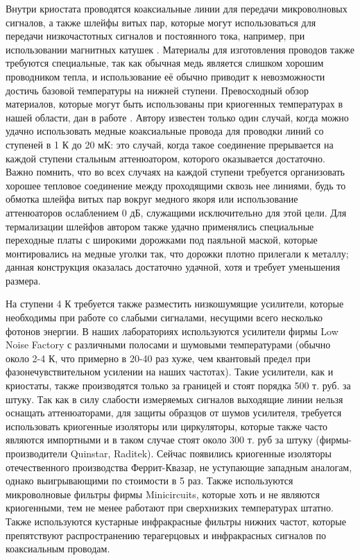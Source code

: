 \documentclass[14pt, a4paper]{extreport}
\numberwithin{equation}{section}
\begin{document}
Внутри криостата проводятся коаксиальные линии для передачи микроволновых сигналов, а также шлейфы витых пар, которые могут использоваться для передачи низкочастотных сигналов и постоянного тока, например, при использовании магнитных катушек \cite{fedorov2017}. Материалы для изготовления проводов также требуются специальные, так как обычная медь является слишком хорошим проводником тепла, и использование её обычно приводит к невозможности достичь базовой температуры на нижней ступени. Превосходный обзор материалов, которые могут быть использованы при криогенных температурах в нашей области, дан в работе \cite{krinner2019engineering}. Автору известен только один случай, когда можно удачно использовать медные коаксиальные провода для проводки линий со ступеней в 1 К до 20 мК: это случай, когда такое соединение прерывается на каждой ступени стальным аттенюатором, которого оказывается достаточно. Важно помнить, что во всех случаях на каждой ступени требуется организовать хорошее тепловое соединение между проходящими сквозь нее линиями, будь то обмотка шлейфа витых пар вокруг медного якоря или использование аттенюаторов ослаблением 0 дБ, служащими исключительно для этой цели. Для термализации шлейфов автором также удачно применялись специальные переходные платы с широкими дорожками под паяльной маской, которые монтировались на медные уголки так, что дорожки плотно прилегали к металлу; данная конструкция оказалась достаточно удачной, хотя и требует уменьшения размера. 

На ступени 4 К требуется также разместить низкошумящие усилители, которые необходимы при работе со слабыми сигналами, несущими всего несколько фотонов энергии. В наших лабораториях используются усилители фирмы Low Noise Factory с различными полосами и шумовыми температурами (обычно около 2-4 К, что примерно в 20-40 раз хуже, чем квантовый предел при фазонечувствительном усилении на наших частотах). Такие усилители, как и криостаты, также производятся только за границей и стоят порядка 500 т. руб. за штуку. Так как в силу слабости измеряемых сигналов выходящие линии нельзя оснащать аттенюаторами, для защиты образцов от шумов усилителя, требуется использовать криогенные изоляторы или циркуляторы, которые также часто являются импортными и в таком случае стоят около 300 т. руб за штуку (фирмы-производители Quinstar, Raditek). Сейчас появились криогенные изоляторы отечественного производства Феррит-Квазар, не уступающие западным аналогам, однако выигрывающими по стоимости в 5 раз. Также используются микроволновые фильтры фирмы Minicircuits, которые хоть и не являются криогенными, тем не менее работают при сверхнизких температурах штатно. Также используются кустарные инфракрасные фильтры нижних частот, которые препятствуют распространению терагерцовых и инфракрасных сигналов по коаксиальным проводам.
\end{document}
